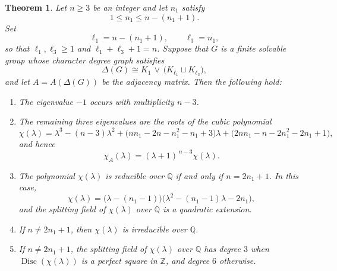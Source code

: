 \documentclass[11pt]{amsart}
\newtheorem{thm}{\bf Theorem}[section]
\begin{document}
\begin{thm}\label{thm:splitting-two-cliques}
Let $n \ge 3$ be an integer and let $n_1$ satisfy
\[
1 \le n_1 \le n-(n_1+1).
\]
Set
\[
\ell_1 = n-(n_1+1), \qquad \ell_3 = n_1,
\]
so that $\ell_1,\ell_3 \ge 1$ and $\ell_1+\ell_3+1=n$. Suppose that $G$ is a finite solvable group whose character degree graph satisfies
\[
\Delta(G)\cong K_1 \,\vee\,\bigl(K_{\ell_1}\sqcup K_{\ell_3}\bigr),
\]
and let $A=A(\Delta(G))$ be the adjacency matrix. Then the following hold:
\begin{enumerate}[label=\upshape(\roman*)]
    \item The eigenvalue $-1$ occurs with multiplicity $n-3$.
    \item The remaining three eigenvalues are the roots of the cubic polynomial
    \[
    \chi(\lambda)
    =\lambda^3-(n-3)\lambda^2
      +\bigl(nn_1-2n-n_1^2-n_1+3\bigr)\lambda
      +\bigl(2nn_1-n-2n_1^2-2n_1+1\bigr),
    \]
    and hence
    \[
    \chi_A(\lambda)=(\lambda+1)^{\,n-3}\chi(\lambda).
    \]
    \item The polynomial $\chi(\lambda)$ is reducible over $\mathbb{Q}$ if and only if
    $n=2n_1+1$. In this case,
    \[
    \chi(\lambda)
    =\bigl(\lambda-(n_1-1)\bigr)
     \bigl(\lambda^2-(n_1-1)\lambda-2n_1\bigr),
    \]
    and the splitting field of $\chi(\lambda)$ over $\mathbb{Q}$ is a quadratic extension.
    \item If $n\neq 2n_1+1$, then $\chi(\lambda)$ is irreducible over $\mathbb{Q}$.
    \item If $n\neq 2n_1+1$, the splitting field of $\chi(\lambda)$ over $\mathbb{Q}$
    has degree $3$ when $\operatorname{Disc}(\chi(\lambda))$ is a perfect square in $\mathbb{Z}$,
    and degree $6$ otherwise.
\end{enumerate}
\end{thm}
\end{document}
